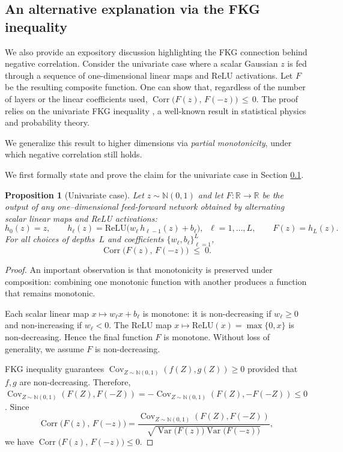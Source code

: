\documentclass[12pt]{article}
\newcommand{\0}{\mathbf{0}}
\newcommand{\bN}{\mathbb{N}}
\newcommand{\relu}{\text{ReLU}}
\DeclareMathOperator{\Cov}{Cov}
\DeclareMathOperator{\Corr}{Corr}
\DeclareMathOperator{\Var}{Var}
\newtheorem{prop}{Proposition}
\begin{document}
\subsection{An alternative explanation via the FKG inequality}\label{subsec:fkg}


We also provide an expository discussion highlighting the FKG connection behind negative correlation. Consider the univariate case where a scalar Gaussian $z$ is fed through a sequence of one-dimensional linear maps and ReLU activations. Let $F$ be the resulting composite function. One can show that, regardless of the number of layers or the linear coefficients used, $
\Corr\bigl(F(z),\,F(-z)\bigr)\,\le\,0.$  The proof  relies on the univariate FKG inequality \citep{fortuin1971correlation}, a well-known result in statistical physics and probability theory.


We generalize this result to higher dimensions via \emph{partial monotonicity}, under which negative correlation still holds.

We first formally state and prove the claim for the univariate case in Section \ref{subsec:fkg}.
\begin{prop}[Univariate case]\label{prop:antithetic-correlation}
Let $z\sim\bN(0,1)$ and let $F:\mathbb R\to\mathbb R$ be the output of any
one–dimensional feed-forward network obtained by alternating scalar
linear maps and {\rm ReLU} activations:
\[
h_0(z)=z,\qquad
h_\ell(z)=\relu\!\bigl(w_\ell\,h_{\ell-1}(z)+b_\ell\bigr),\;\;
\ell=1,\dots,L,\qquad
F(z)=h_L(z).
\]
For all choices of depths~$L$ and coefficients $\{w_\ell,b_\ell\}_{\ell=1}^L$,
\[
\Corr\bigl(F(z),\,F(-z)\bigr)\;\le\;0 .
\]
\end{prop}

\begin{proof}
 An important observation is that monotonicity is preserved under composition: combining one monotonic function with another produces a function that remains monotonic.


Each scalar linear map $x\mapsto w_\ell x+b_\ell$ is monotone:
it is non-decreasing if $w_\ell\ge0$ and non-increasing if $w_\ell<0$.
The ReLU map $x\mapsto\relu(x)=\max\{0,x\}$ is non-decreasing.
Hence the final function $F$ is monotone. Without loss of generality, we assume $F$ is non-decreasing.

FKG inequality guarantees $\Cov_{Z\sim \bN(0,1)}(f(Z),g(Z)) \geq 0$ provided that $f, g$ are non-decreasing. Therefore, $\Cov_{Z\sim \bN(0,1)}(F(Z),F(-Z)) = - \Cov_{Z\sim \bN(0,1)}(F(Z),-F(-Z)) \leq 0$. Since \[\Corr\bigl(F(z),\,F(-z)\bigr) = \frac{\Cov_{Z\sim \bN(0,1)}(F(Z),F(-Z))}{\sqrt{\Var\bigl(F(z)\bigr)\Var\bigl(F(-z)\bigr)}},\] we have $\Corr\bigl(F(z),\,F(-z)\bigr)\leq 0$.
\end{proof}
\end{document}
